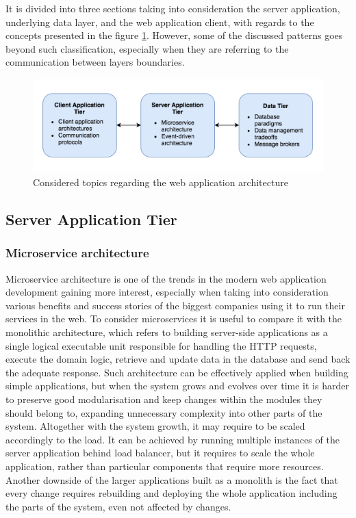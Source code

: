 It is divided into three sections taking into consideration the server application, underlying data layer, and the web application client, with regards to the concepts presented in the figure \ref{fig:web-app-architecture-concepts}. However, some of the discussed patterns goes beyond such classification, especially when they are referring to the communication between layers boundaries.

\begin{figure}[h]
    \centering
    \includegraphics[width=1\textwidth]{assets/03-web-applications/WebAppLayers.png}
    \caption{Considered topics regarding the web application architecture}
    \label{fig:web-app-architecture-concepts}
\end{figure}

\subsection{Server Application Tier}

\subsubsection{Microservice architecture}

Microservice architecture is one of the trends in the modern web application development gaining more interest, especially when taking into consideration various benefits and success stories of the biggest companies using it to run their services in the web. To consider microservices it is useful to compare it with the monolithic architecture, which refers to building server-side applications as a single logical executable unit responsible for handling the HTTP requests, execute the domain logic, retrieve and update data in the database and send back the adequate response. Such architecture can be effectively applied when building simple applications, but when the system grows and evolves over time it is harder to preserve good modularisation and keep changes within the modules they should belong to, expanding unnecessary complexity into other parts of the system. Altogether with the system growth, it may require to be scaled accordingly to the load. It can be achieved by running multiple instances of the server application behind load balancer, but it requires to scale the whole application, rather than particular components that require more resources. Another downside of the larger applications built as a monolith is the fact that every change requires rebuilding and deploying the whole application including the parts of the system, even not affected by changes.

